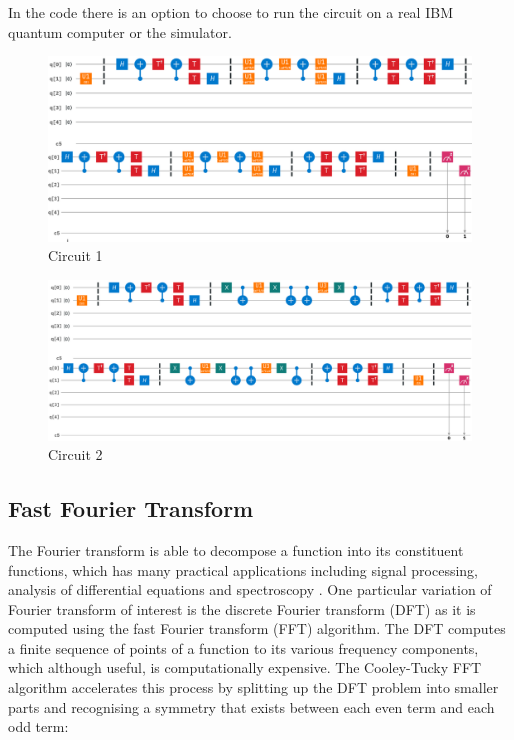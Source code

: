 \documentclass{article}
\begin{document}
In the code there is an option to choose to run the circuit on a real IBM quantum computer or the simulator.

\begin{figure}[!htb]
\includegraphics[scale=0.42]{../images/circuit1_colour}
  \centering
  \caption{Circuit 1 }
\end{figure}

\begin{figure}[!htb]
\includegraphics[scale=0.34]{../images/circuit2_colour}
  \centering
  \caption{Circuit 2}
\end{figure}

\subsection{Fast Fourier Transform}
The Fourier transform is able to decompose a function into its constituent functions, which has many practical applications including signal processing, analysis of differential equations and spectroscopy \cite{fourier}. One particular variation of Fourier transform of interest is the discrete Fourier transform (DFT) as it is computed using the fast Fourier transform (FFT) algorithm. The DFT computes a finite sequence of points of a function to its various frequency components, which although useful, is computationally expensive. The Cooley-Tucky \cite{turkey} FFT algorithm accelerates this process by splitting up the DFT problem into smaller parts and recognising a symmetry that exists between each even term and each odd term:
\end{document}
